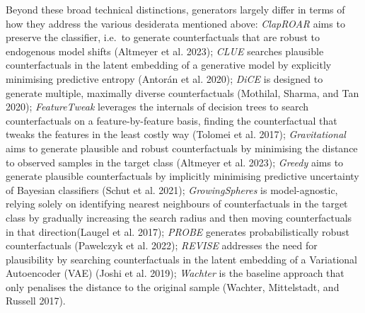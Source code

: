 \documentclass{juliacon}
\begin{document}
Beyond these broad technical distinctions, generators largely differ in
terms of how they address the various desiderata mentioned above:
\emph{ClapROAR} aims to preserve the classifier, i.e.~to generate
counterfactuals that are robust to endogenous model shifts (Altmeyer et
al. 2023); \emph{CLUE} searches plausible counterfactuals in the latent
embedding of a generative model by explicitly minimising predictive
entropy (Antorán et al. 2020); \emph{DiCE} is designed to generate
multiple, maximally diverse counterfactuals (Mothilal, Sharma, and Tan
2020); \emph{FeatureTweak} leverages the internals of decision trees to
search counterfactuals on a feature-by-feature basis, finding the
counterfactual that tweaks the features in the least costly way (Tolomei
et al. 2017); \emph{Gravitational} aims to generate plausible and robust
counterfactuals by minimising the distance to observed samples in the
target class (Altmeyer et al. 2023); \emph{Greedy} aims to generate
plausible counterfactuals by implicitly minimising predictive
uncertainty of Bayesian classifiers (Schut et al. 2021);
\emph{GrowingSpheres} is model-agnostic, relying solely on identifying
nearest neighbours of counterfactuals in the target class by gradually
increasing the search radius and then moving counterfactuals in that
direction(Laugel et al. 2017); \emph{PROBE} generates probabilistically
robust counterfactuals (Pawelczyk et al. 2022); \emph{REVISE} addresses
the need for plausibility by searching counterfactuals in the latent
embedding of a Variational Autoencoder (VAE) (Joshi et al. 2019);
\emph{Wachter} is the baseline approach that only penalises the distance
to the original sample (Wachter, Mittelstadt, and Russell 2017).

\onecolumn
\end{document}
